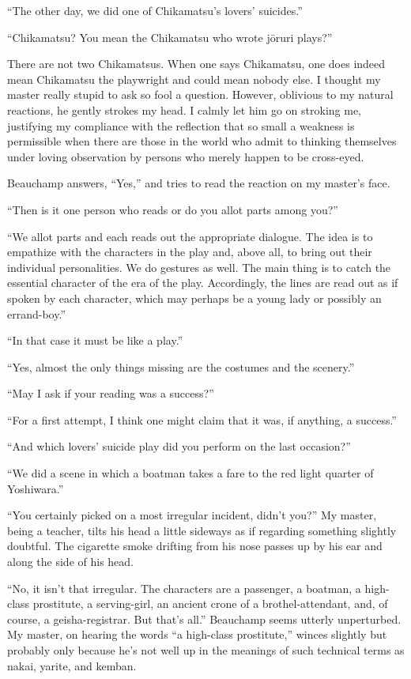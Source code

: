\documentclass[12pt, openright]{book}
\begin{document}
``The other day, we did one of Chikamatsu's lovers' suicides.''

``Chikamatsu? You mean the Chikamatsu who wrote jōruri plays?''

There are not two Chikamatsus. When one says Chikamatsu, one does indeed
mean Chikamatsu the playwright and could mean nobody else. I thought my
master really stupid to ask so fool a question. However, oblivious to my
natural reactions, he gently strokes my head. I calmly let him go on
stroking me, justifying my compliance with the reflection that so small
a weakness is permissible when there are those in the world who admit to
thinking themselves under loving observation by persons who merely
happen to be cross-eyed.

Beauchamp answers, ``Yes,'' and tries to read the reaction on my
master's face.

``Then is it one person who reads or do you allot parts among you?''

``We allot parts and each reads out the appropriate dialogue. The idea
is to empathize with the characters in the play and, above all, to bring
out their individual personalities. We do gestures as well. The main
thing is to catch the essential character of the era of the play.
Accordingly, the lines are read out as if spoken by each character,
which may perhaps be a young lady or possibly an errand-boy.''

``In that case it must be like a play.''

``Yes, almost the only things missing are the costumes and the
scenery.''

``May I ask if your reading was a success?''

``For a first attempt, I think one might claim that it was, if anything,
a success.''

``And which lovers' suicide play did you perform on the last occasion?''

``We did a scene in which a boatman takes a fare to the red light
quarter of Yoshiwara.''

``You certainly picked on a most irregular incident, didn't you?'' My
master, being a teacher, tilts his head a little sideways as if
regarding something slightly doubtful. The cigarette smoke drifting from
his nose passes up by his ear and along the side of his head.

``No, it isn't that irregular. The characters are a passenger, a
boatman, a high-class prostitute, a serving-girl, an ancient crone of a
brothel-attendant, and, of course, a geisha-registrar. But that's all.''
Beauchamp seems utterly unperturbed. My master, on hearing the words ``a
high-class prostitute,'' winces slightly but probably only because he's
not well up in the meanings of such technical terms as nakai, yarite,
and kemban.
\end{document}
